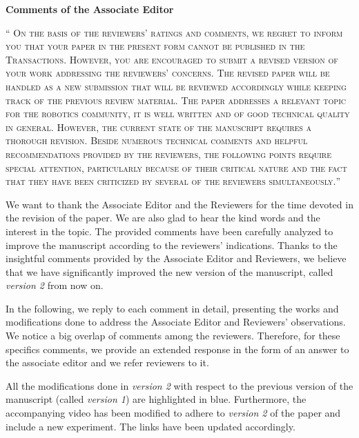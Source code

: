 \documentclass[10pt]{article}
\renewcommand{\theenumi}{(\roman{enumi})}
\renewcommand{\labelenumi}{\theenumi}
\newcommand{\referee}[1]{\;
  \begin{minipage}[t]{.95\textwidth}
    ``{\small\color{red} \textsc{#1}}''
  \end{minipage}\medskip
  }
\newcommand{\version}[1]{\textit{version #1}}
\begin{document}


\bigskip
\hspace*{-25pt} \textbf{\large Comments of the Associate Editor}

\begin{enumerate}[label={[E:\,\arabic{enumi}]}]

\item\label{reply:E1:1}
\referee{On the basis of the reviewers' ratings and comments, we regret to inform you that your paper in the present form cannot be published in the Transactions. However, you are encouraged to submit a revised version of your work addressing the reviewers' concerns. The revised paper will be handled as a new submission that will be reviewed accordingly while keeping track of the previous review material. The paper addresses a relevant topic for the robotics community, it is well written and of good technical quality in general. However, the current state of the manuscript requires a thorough revision. Beside numerous technical comments and helpful recommendations provided by the reviewers, the following points require special attention, particularly because of their critical nature and the fact that they have been criticized by several of the reviewers simultaneously.}

We want to thank the Associate Editor and the Reviewers for the time devoted in the revision of the paper. We are also glad to hear the kind words and the interest in the topic. The provided comments have been carefully analyzed to improve the manuscript according to the reviewers' indications. Thanks to the insightful comments provided by the Associate Editor and Reviewers, we believe that we have significantly improved the new version of the manuscript, called \version{2} from now on.

In the following, we reply to each comment in detail, presenting the works and modifications done to address the Associate Editor and Reviewers' observations. We notice a big overlap of comments among the reviewers. Therefore, for these specifics comments, we provide an extended response in the form of an answer to the associate editor and we refer reviewers to it.

All the modifications done in \version{2} with respect to the previous version of the manuscript (called \version{1}) are highlighted in blue. Furthermore, the accompanying video has been modified to adhere to \version{2} of the paper and include a new experiment. The links have been updated accordingly.


\end{enumerate}
\end{document}
